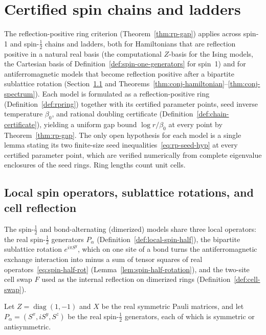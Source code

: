\chapter{Certified spin chains and ladders}
\label{chap:models}

The reflection-positive ring criterion (Theorem~\ref{thm:rp-gap}) applies across spin-1 and
spin-\(\tfrac12\) chains and ladders, both for Hamiltonians that are reflection positive in a
natural real basis (the computational \(Z\)-basis for the Ising models, the Cartesian basis of
Definition~\ref{def:spin-one-generators} for spin~1) and for antiferromagnetic models that become
reflection positive after a bipartite sublattice rotation (Section~\ref{sec:sublattice-rot} and
Theorems~\ref{thm:conj-hamiltonian}--\ref{thm:conj-spectrum}). Each model is formulated as a
reflection-positive ring (Definition~\ref{def:rpring}) together with its certified parameter
points, seed inverse temperature \(\beta_0\), and rational doubling certificate
(Definition~\ref{def:chain-certificate}), yielding a uniform gap bound \(\log r / \beta_0\) at
every point by Theorem~\ref{thm:rp-gap}. The only open hypothesis for each model is a single lemma
stating its two finite-size seed inequalities~\eqref{eq:rp-seed-hyp} at every certified parameter
point, which are verified numerically from complete eigenvalue enclosures of the seed
rings. Ring lengths count unit cells.

\section{Local spin operators, sublattice rotations, and cell reflection}
\label{sec:sublattice-rot}

The spin-\(\tfrac12\) and bond-alternating (dimerized) models share three local operators: the real
spin-\(\tfrac12\) generators \(P_\alpha\) (Definition~\ref{def:local-spin-half}), the bipartite
sublattice rotation \(e^{i\pi S^y}\), which on one site of a bond turns the antiferromagnetic
exchange interaction into minus a sum of tensor squares of real operators~\eqref{eq:spin-half-rot}
(Lemma~\ref{lem:spin-half-rotation}), and the two-site cell swap \(F\) used as the internal
reflection on dimerized rings (Definition~\ref{def:cell-swap}).

\begin{definition}
  \label{def:local-spin-half}
  \leanok
  Let \(Z = \operatorname{diag}(1, -1)\) and \(X\) be the real symmetric Pauli matrices, and let
  \(P_\alpha = (S^x, iS^y, S^z)\) be the real spin-\(\tfrac12\) generators, each of which is
  symmetric or antisymmetric.
\end{definition}


